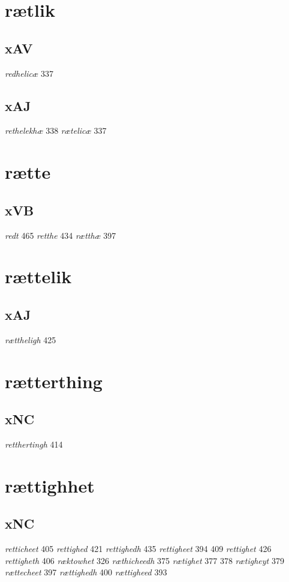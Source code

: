 \documentclass[a4paper,twocolumn]{article}
\begin{document}
\section{rætlik}
\label{sec:orga2ea67e}
\subsection{xAV}
\label{sec:orge9f76a4}
\emph{redhelicæ} 337 
\subsection{xAJ}
\label{sec:org31bb484}
\emph{rethelekhæ} 338 \emph{rætelicæ} 337 
\section{rætte}
\label{sec:orgf11d992}
\subsection{xVB}
\label{sec:orgc73aea2}
\emph{redt} 465 \emph{retthe} 434 \emph{rætthæ} 397 
\section{rættelik}
\label{sec:org595f617}
\subsection{xAJ}
\label{sec:org0d64b99}
\emph{rættheligh} 425 
\section{rætterthing}
\label{sec:org40f49be}
\subsection{xNC}
\label{sec:orgdc53054}
\emph{retthertingh} 414 
\section{rættighhet}
\label{sec:org7b1f778}
\subsection{xNC}
\label{sec:org36b3f37}
\emph{retticheet} 405 \emph{rettighed} 421 \emph{rettighedh} 435 \emph{rettigheet} 394 409 \emph{rettighet} 426 \emph{rettigheth} 406 \emph{ræktowhet} 326 \emph{ræthicheedh} 375 \emph{rætighet} 377 378 \emph{rætigheyt} 379 \emph{rættecheet} 397 \emph{rættighedh} 400 \emph{rættigheed} 393 
\end{document}
